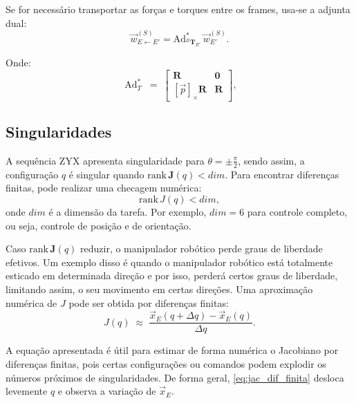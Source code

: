 Se for necessário transportar as forças e torques entre os frames, usa-se a adjunta dual:
\begin{equation}
\label{eq:adjunta_dual1}
\vec w^{(S)}_{E\leftarrow E'}=\mathrm{Ad}^*_{^{E}\mathbf T_{E'}}\,\vec w^{(S)}_{E'}.
\end{equation}

Onde:
\begin{equation}
\label{eq:adjunta_dual2}
\operatorname{Ad}^{*}_{T}
\;=\;
\begin{bmatrix}
\mathbf R & \mathbf 0 \\
[\vec p]_\times \mathbf R & \mathbf R
\end{bmatrix},
\end{equation}


%

\subsection{Singularidades}
A sequência ZYX apresenta singularidade para \(\theta=\pm\frac{\pi}{2}\), sendo assim,
a configuração $q$
é singular quando $\mathrm{rank}\,\mathbf J(q)<dim$.
Para encontrar diferenças finitas, pode realizar uma checagem numérica:
\begin{equation}
\label{eq:rank_condition}
\mathrm{rank}\, J(q) < dim,
\end{equation}
onde $dim$ é a dimensão da tarefa. Por exemplo, $dim=6$ para controle completo, ou seja, controle de posição e de orientação.

Caso $\mathrm{rank}\,\mathbf J(q)$ reduzir, o manipulador robótico perde graus de liberdade efetivos.
Um exemplo disso é quando o manipulador robótico está totalmente esticado em determinada direção e por isso, perderá certos graus de liberdade, limitando assim, o seu movimento em certas direções.
Uma aproximação numérica de $J$ pode ser obtida por diferenças finitas:
\begin{equation}
\label{eq:jac_dif_finita}
J(q) \;\approx\;
\frac{\vec{x}_{E}(q+\Delta q) - \vec{x}_{E}(q)}{\Delta q}.
\end{equation}

A equação apresentada é útil para estimar de forma numérica o Jacobiano por diferenças finitas, pois certas configurações ou comandos podem explodir os números próximos de singularidades.
De forma geral, \eqref{eq:jac_dif_finita} desloca levemente $q$ e observa a variação de $\vec x_E$.

